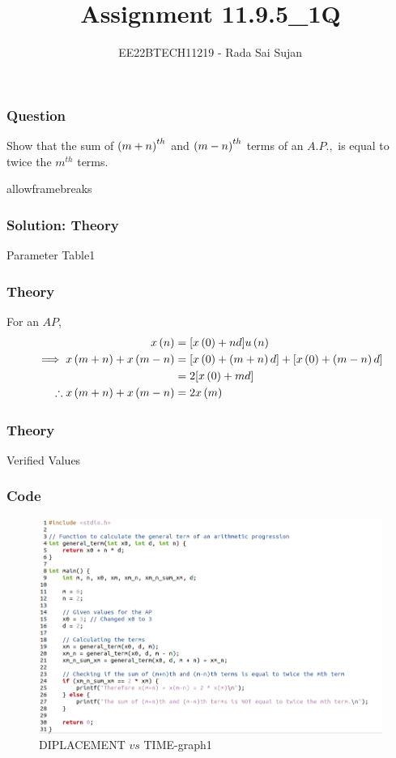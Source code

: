 \documentclass{beamer}
\begin{document}
\title{Assignment 11.9.5\_1Q}
\author{EE22BTECH11219 - Rada Sai Sujan$^{}$%
}
\frame{\titlepage}

\begin{frame}
\frametitle{Question}
Show that the sum of $\left(m+n\right)^{th}$ and $\left(m-n\right)^{th}$ terms of an $A.P.,$ is equal to twice the $m^{th}$ terms.    \\
\end{frame}

\begin{frame}{allowframebreaks}
\frametitle{Solution: Theory}
\begin{table}[ht]
    \centering
    \def\arraystretch{1.5}
    
    \caption{Parameter Table1}
    \label{tab:11.9.5.1.1}
\end{table}
\end{frame}

\begin{frame}
\frametitle{Theory}
For an $AP$,
\begin{align}
    x\left(n\right)&=[x\left(0\right)+nd]u\left(n\right)   \\
    \implies x\left(m+n\right)+x\left(m-n\right)&=[x\left(0\right)+\left(m+n\right)d]+[x\left(0\right)+\left(m-n\right)d] \\
    &=2[x\left(0\right)+md]   \\
    \therefore x\left(m+n\right)+x\left(m-n\right)&=2x\left(m\right)
\end{align}
\end{frame}

\begin{frame}
\frametitle{Theory}
\begin{table}[ht]
    \centering
    \def\arraystretch{1.5}
    
    \caption{Verified Values}
    \label{tab:11.9.5.1.2}
\end{table}
\end{frame}

\begin{frame}
\frametitle{Code}
\begin{figure}[ht]
                        \centering
                        \includegraphics[width=\columnwidth]{figs/a.png}
                        \caption{DIPLACEMENT $vs$ TIME-graph1}
                        \label{fig:1}
\end{figure}
\end{frame}
\end{document}
